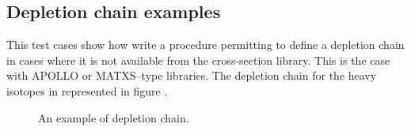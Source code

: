 \subsection{Depletion chain examples}\label{sect:ExDEPLETE}

This test cases show how write a procedure permitting to
define a depletion chain in cases where it is not available from
the cross-section library. This is the case with APOLLO or MATXS--type
libraries. The depletion chain for the heavy isotopes in represented
in figure .

\begin{figure}[h!]
\begin{center} 
\epsfxsize=15cm \centerline{ }
\parbox{14.0cm}{\caption{An example of depletion chain.}\label{fig:deplete}}   
\end{center}  
\end{figure}


\eject
